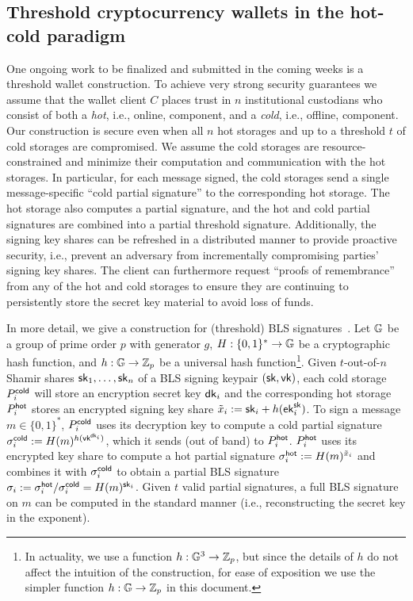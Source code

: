 \subsection{Threshold cryptocurrency wallets in the hot-cold paradigm}\label{sec:ksp}

One ongoing work to be finalized and submitted in the coming weeks is a threshold wallet construction. To achieve very strong security guarantees we assume that the wallet client $C$ places trust in $n$ institutional custodians who consist of both a \emph{hot}, i.e., online, component, and a \emph{cold}, i.e., offline, component. Our construction is secure even when all $n$ hot storages and up to a threshold $t$ of cold storages are compromised. We assume the cold storages are resource-constrained and minimize their computation and communication with the hot storages. In particular, for each message signed, the cold storages send a single message-specific ``cold partial signature'' to the corresponding hot storage. The hot storage also computes a partial signature, and the hot and cold partial signatures are combined into a partial threshold signature. Additionally, the signing key shares can be refreshed in a distributed manner to provide proactive security, i.e., prevent an adversary from incrementally compromising parties' signing key shares. The client can furthermore request ``proofs of remembrance'' from any of the hot and cold storages to ensure they are continuing to persistently store the secret key material to avoid loss of funds.

In more detail, we give a construction for (threshold) BLS signatures~\cite{AC:BonLynSha01}. Let $\mathbb{G}$ be a group of prime order $p$ with generator $g$, $H: \{0,1\}^* \to \mathbb{G}$ be a cryptographic hash function, and $h: \mathbb{G} \to \mathbb{Z}_p$ be a universal hash function\footnote{In actuality, we use a function $h: \mathbb{G}^3 \to \mathbb{Z}_p$, but since the details of $h$ do not affect the intuition of the construction,  for ease of exposition we use the simpler function $h: \mathbb{G} \to \mathbb{Z}_p$ in this document.}.
Given $t$-out-of-$n$ Shamir shares $\mathsf{sk}_1, \dots, \mathsf{sk}_n$ of a BLS signing keypair $(\mathsf{sk}, \mathsf{vk})$, each cold storage $P_i^{\mathsf{cold}}$ will store an encryption secret key $\mathsf{dk}_i$ and the corresponding hot storage $P_i^{\mathsf{hot}}$ stores an encrypted signing key share $\tilde{x}_i := \mathsf{sk}_i + h(\mathsf{ek}_i^{\mathsf{sk}})$. To sign a message $m \in \{0,1\}^*$, $P_i^{\mathsf{cold}}$ uses its decryption key to compute a cold partial signature $\sigma_i^{\mathsf{cold}} := H(m)^{h(\mathsf{vk}^{\mathsf{dk}_i})}$, which it sends (out of band) to $P_i^{\mathsf{hot}}$. $P_i^{\mathsf{hot}}$ uses its encrypted key share to compute a hot partial signature $\sigma_i^{\mathsf{hot}} := H(m)^{\tilde{x}_i}$ and combines it with $\sigma_i^{\mathsf{cold}}$ to obtain a partial BLS signature $\sigma_i := \sigma_i^{\mathsf{hot}} / \sigma_i^{\mathsf{cold}} = H(m)^{\mathsf{sk}_i}$. Given $t$ valid partial signatures, a full BLS signature on $m$ can be computed in the standard manner (i.e., reconstructing the secret key in the exponent).

